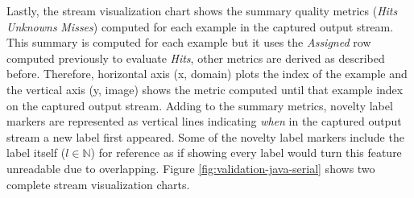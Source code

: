 Lastly, the stream visualization chart shows the summary quality metrics
(\emph{Hits} \emph{Unknowns} \emph{Misses})
computed for each example in the captured output stream.
This summary is computed for each example but it uses the \emph{Assigned} row
computed previously to evaluate \emph{Hits}, other metrics are derived as
described before.
Therefore, horizontal axis (x, domain) plots the index of the example and the
vertical axis (y, image) shows the metric computed until that example index on the captured
output stream.
Adding to the summary metrics, novelty label markers are represented as vertical
lines indicating \emph{when} in the captured output stream a new label first
appeared.
Some of the novelty label markers include the label itself ($l \in \mathbb{N}$)
for reference as if showing every label would turn this feature unreadable due
to overlapping.
Figure \ref{fig:validation-java-serial} shows two complete stream visualization charts.

